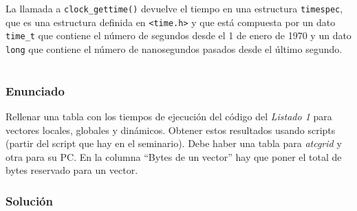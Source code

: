 La llamada a \texttt{clock\_gettime()} devuelve el tiempo en una estructura \texttt{timespec}, que es una estructura definida en \texttt{<time.h>} y que está compuesta por un dato \texttt{time\_t} que contiene el número de segundos desde el 1 de enero de 1970 y un dato \texttt{long} que contiene el número de nanosegundos pasados desde el último segundo.

\section{}\label{ej1-7}

\subsubsection{Enunciado}

Rellenar una tabla con los tiempos de ejecución del código del \textit{Listado 1} para vectores locales, globales y dinámicos.
Obtener estos resultados usando scripts (partir del script que hay en el seminario).
Debe haber una tabla para \textit{atcgrid} y otra para su PC\@.
En la columna ``Bytes de un vector'' hay que poner el total de bytes reservado para un vector.

\subsubsection{Solución}

